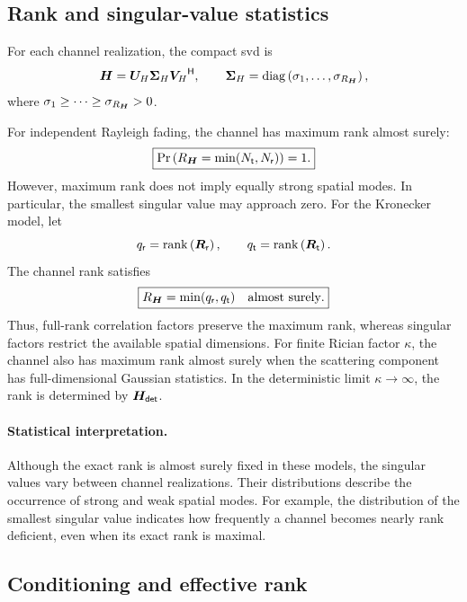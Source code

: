 \subsection{Rank and singular-value statistics}

For each channel realization, the compact \ac{svd} is
\begin{equation*}
	\bm{H}
	=\bm{U}_{H}\bm{\Sigma}_{H}{\bm{V}_{H}}^{\mathsf{H}},
	\qquad
	\bm{\Sigma}_{H}
	=\operatorname{diag}\left(\sigma_1,\ldots,\sigma_{R_{\bm{H}}}\right),
\end{equation*}
where
$\sigma_1\geq\cdots\geq\sigma_{R_{\bm{H}}}>0$.

For independent Rayleigh fading, the channel has
maximum rank almost surely:
\begin{equation}\label{eq:rank-rayleigh}
	\boxed{
		\Pr\left(R_{\bm{H}}=\min(N_{\mathsf{t}},N_{\mathsf{r}})\right)=1.
	}
\end{equation}
However, maximum rank does not imply equally
strong spatial modes. In particular, the smallest
singular value may approach zero.
%
For the Kronecker model, let
\begin{equation*}
	q_{\mathsf r}=\operatorname{rank}\left(\bm{R}_{\mathsf r}\right),
	\qquad
	q_{\mathsf t}=\operatorname{rank}\left(\bm{R}_{\mathsf t}\right).
\end{equation*}
The channel rank satisfies
\begin{equation}\label{eq:rank-kronecker}
	\boxed{
		R_{\bm{H}}=\min(q_{\mathsf r},q_{\mathsf t})
		\quad\text{almost surely}.
	}
\end{equation}
Thus, full-rank correlation factors preserve
the maximum rank, whereas singular factors
restrict the available spatial dimensions.
%
For finite Rician factor $\kappa$, the channel
also has maximum rank almost surely when
the scattering component has full-dimensional
Gaussian statistics. In the deterministic limit
$\kappa\to\infty$, the rank is determined by
$\bm{H}_{\mathsf{det}}$.

\paragraph{Statistical interpretation.}
Although the exact rank is almost surely fixed
in these models, the singular values vary
between channel realizations.
%
Their distributions describe the occurrence of
strong and weak spatial modes. For example,
the distribution of the smallest singular value
indicates how frequently a channel becomes
nearly rank deficient, even when its exact
rank is maximal.


\subsection{Conditioning and effective rank}

